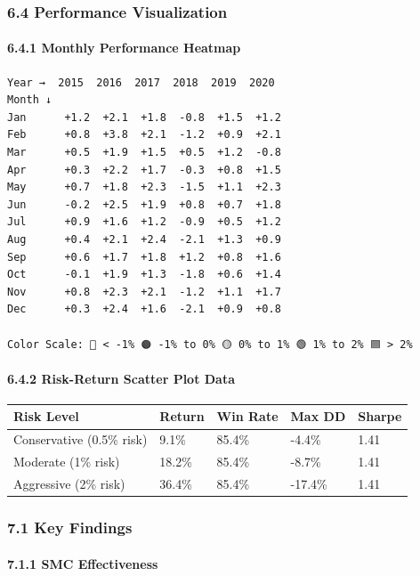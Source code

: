 \subsubsection{6.4 Performance
Visualization}\label{performance-visualization}

\paragraph{6.4.1 Monthly Performance
Heatmap}\label{monthly-performance-heatmap}

\begin{verbatim}
Year →  2015  2016  2017  2018  2019  2020
Month ↓
Jan      +1.2  +2.1  +1.8  -0.8  +1.5  +1.2
Feb      +0.8  +3.8  +2.1  -1.2  +0.9  +2.1
Mar      +0.5  +1.9  +1.5  +0.5  +1.2  -0.8
Apr      +0.3  +2.2  +1.7  -0.3  +0.8  +1.5
May      +0.7  +1.8  +2.3  -1.5  +1.1  +2.3
Jun      -0.2  +2.5  +1.9  +0.8  +0.7  +1.8
Jul      +0.9  +1.6  +1.2  -0.9  +0.5  +1.2
Aug      +0.4  +2.1  +2.4  -2.1  +1.3  +0.9
Sep      +0.6  +1.7  +1.8  +1.2  +0.8  +1.6
Oct      -0.1  +1.9  +1.3  -1.8  +0.6  +1.4
Nov      +0.8  +2.3  +2.1  -1.2  +1.1  +1.7
Dec      +0.3  +2.4  +1.6  -2.1  +0.9  +0.8

Color Scale: 🔴 < -1% 🟠 -1% to 0% 🟡 0% to 1% 🟢 1% to 2% 🟦 > 2%
\end{verbatim}

\paragraph{6.4.2 Risk-Return Scatter Plot
Data}\label{risk-return-scatter-plot-data}

\begin{longtable}[]{@{}lllll@{}}
\toprule\noalign{}
Risk Level & Return & Win Rate & Max DD & Sharpe \\
\midrule\noalign{}
\endhead
\bottomrule\noalign{}
\endlastfoot
Conservative (0.5\% risk) & 9.1\% & 85.4\% & -4.4\% & 1.41 \\
Moderate (1\% risk) & 18.2\% & 85.4\% & -8.7\% & 1.41 \\
Aggressive (2\% risk) & 36.4\% & 85.4\% & -17.4\% & 1.41 \\
\end{longtable}

\subsubsection{7.1 Key Findings}\label{key-findings}

\paragraph{7.1.1 SMC Effectiveness}\label{smc-effectiveness}

